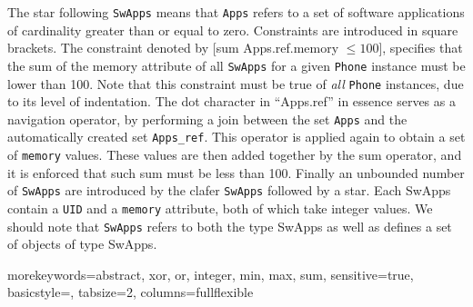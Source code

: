 \documentclass{article}
\begin{document}
%
The star following  \texttt{SwApps} means that \texttt{Apps} refers to a set of software applications of cardinality greater than or equal to zero. 
%
Constraints are introduced in  square brackets. The constraint denoted by [sum Apps.ref.memory $\le 100$], specifies that the sum of the memory attribute of all \texttt{SwApps} for a given \texttt{Phone} instance must be lower than 100. Note that this constraint must be true of \textit{all} \texttt{Phone} instances, due to its level of indentation.    
%
The dot character in ``Apps.ref''  in essence serves as a navigation operator, by performing a join between the set \texttt{Apps} and the automatically created set \texttt{Apps\_ref}. This operator is applied again to obtain a set of \texttt{memory} values. These values are then added together by the sum operator, and it is enforced that such sum must be less than 100.
%
Finally an unbounded number of \texttt{SwApps} are introduced by the clafer \texttt{SwApps} followed by a star. Each SwApps contain a \texttt{UID} and a \texttt{memory} attribute, both of which take integer values.  
%
We should note that \texttt{SwApps} refers to both the type SwApps as well as defines a set of objects of type SwApps.

{morekeywords={abstract, xor, or, integer, min, max, sum},
sensitive=true,
basicstyle={\sffamily\small},
tabsize=2,
columns=fullflexible
}
\end{document}
